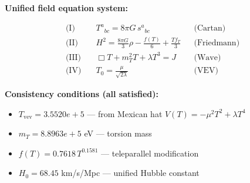 
\textbf{Unified field equation system:}

\begin{align}
  \text{(I)} \quad & T^a{}_{bc} = 8\pi G \, s^a{}_{bc} && \text{(Cartan)} \\
  \text{(II)} \quad & H^2 = \frac{8\pi G}{3}\rho - \frac{f(T)}{6} + \frac{Tf_T}{3} && \text{(Friedmann)} \\
  \text{(III)} \quad & \Box T + m_T^2 T + \lambda T^3 = J && \text{(Wave)} \\
  \text{(IV)} \quad & T_0 = \frac{\mu}{\sqrt{2\lambda}} && \text{(VEV)}
\end{align}

\textbf{Consistency conditions (all satisfied):}
\begin{itemize}
  \item $T_{\text{vev}} = 3.5520e+5$ — from Mexican hat $V(T) = -\mu^2 T^2 + \lambda T^4$
  \item $m_T = 8.8963e+5$ eV — torsion mass
  \item $f(T) = 0.7618 \, T^{0.1581}$ — teleparallel modification
  \item $H_0 = 68.45$ km/s/Mpc — unified Hubble constant
\end{itemize}